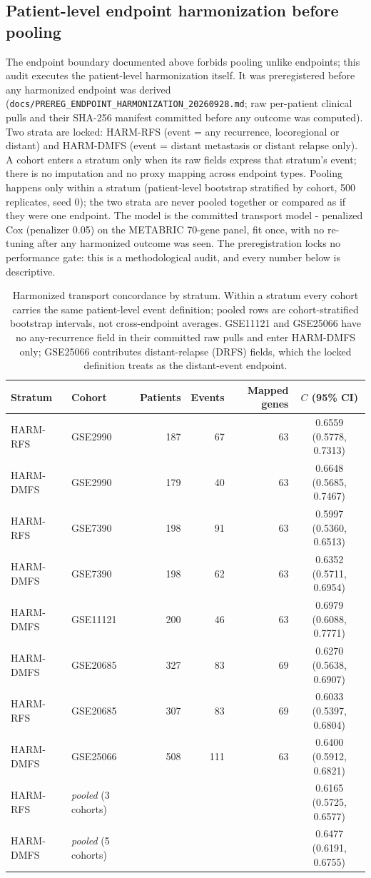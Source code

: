\subsection{Patient-level endpoint harmonization before pooling}
The endpoint boundary documented above forbids pooling unlike endpoints; this audit executes the patient-level harmonization itself. It was preregistered before any harmonized endpoint was derived (\texttt{docs/PREREG\_ENDPOINT\_HARMONIZATION\_}\allowbreak\texttt{20260928.md}; raw per-patient clinical pulls and their SHA-256 manifest committed before any outcome was computed). Two strata are locked: HARM-RFS (event = any recurrence, locoregional or distant) and HARM-DMFS (event = distant metastasis or distant relapse only). A cohort enters a stratum only when its raw fields express that stratum's event; there is no imputation and no proxy mapping across endpoint types. Pooling happens only within a stratum (patient-level bootstrap stratified by cohort, 500 replicates, seed 0); the two strata are never pooled together or compared as if they were one endpoint. The model is the committed transport model - penalized Cox (penalizer 0.05) on the METABRIC 70-gene panel, fit once, with no re-tuning after any harmonized outcome was seen. The preregistration locks no performance gate: this is a methodological audit, and every number below is descriptive.
\begin{table}[htbp]\centering\footnotesize
\begin{tabular}{llrrrc}\hline
Stratum & Cohort & Patients & Events & Mapped genes & $C$ (95\% CI) \\ \hline
HARM-RFS & GSE2990 & 187 & 67 & 63 & 0.6559 (0.5778, 0.7313) \\
HARM-DMFS & GSE2990 & 179 & 40 & 63 & 0.6648 (0.5685, 0.7467) \\
HARM-RFS & GSE7390 & 198 & 91 & 63 & 0.5997 (0.5360, 0.6513) \\
HARM-DMFS & GSE7390 & 198 & 62 & 63 & 0.6352 (0.5711, 0.6954) \\
HARM-DMFS & GSE11121 & 200 & 46 & 63 & 0.6979 (0.6088, 0.7771) \\
HARM-DMFS & GSE20685 & 327 & 83 & 69 & 0.6270 (0.5638, 0.6907) \\
HARM-RFS & GSE20685 & 307 & 83 & 69 & 0.6033 (0.5397, 0.6804) \\
HARM-DMFS & GSE25066 & 508 & 111 & 63 & 0.6400 (0.5912, 0.6821) \\
\hline
HARM-RFS & \textit{pooled} (3 cohorts) & & & & 0.6165 (0.5725, 0.6577) \\
\hline
HARM-DMFS & \textit{pooled} (5 cohorts) & & & & 0.6477 (0.6191, 0.6755) \\
\hline\end{tabular}
\caption{Harmonized transport concordance by stratum. Within a stratum every cohort carries the same patient-level event definition; pooled rows are cohort-stratified bootstrap intervals, not cross-endpoint averages. GSE11121 and GSE25066 have no any-recurrence field in their committed raw pulls and enter HARM-DMFS only; GSE25066 contributes distant-relapse (DRFS) fields, which the locked definition treats as the distant-event endpoint.}\label{tab:harm-cindex}
\end{table}
